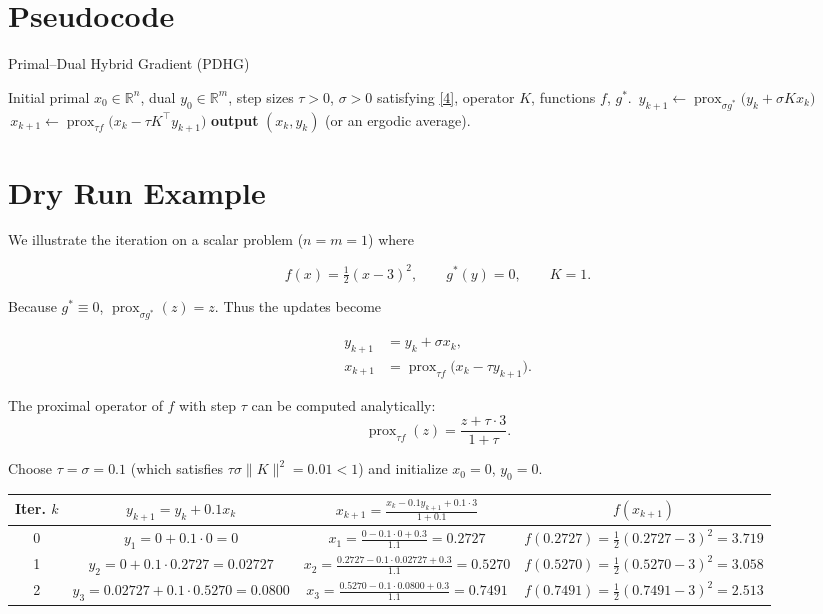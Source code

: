 \documentclass{article}
\newcommand{\prox}{\operatorname{prox}}
\begin{document}
\section*{Pseudocode}
\begin{algorithm}[H]
\caption{Primal–Dual Hybrid Gradient (PDHG)}\label{alg:pdhg}
\begin{algorithmic}[1]
\Require Initial primal $x_{0}\in\mathbb{R}^{n}$, dual $y_{0}\in\mathbb{R}^{m}$,
step sizes $\tau>0$, $\sigma>0$ satisfying \eqref{4},
operator $K$, functions $f$, $g^{*}$.
    \State $\,y_{k+1}\gets \prox_{\sigma g^{*}}\!\bigl(y_{k}+\sigma Kx_{k}\bigr)$ 
    \State $\,x_{k+1}\gets \prox_{\tau f}\!\bigl(x_{k}-\tau K^{\top}y_{k+1}\bigr)$ 
\EndFor
\State \textbf{output} $(x_{k},y_{k})$ (or an ergodic average).
\end{algorithmic}
\end{algorithm}

\section*{Dry Run Example}
We illustrate the iteration on a scalar problem ($n=m=1$) where  

\[
f(x)=\tfrac12 (x-3)^{2},\qquad g^{*}(y)=0,\qquad K=1.
\]

Because $g^{*}\equiv0$, $\prox_{\sigma g^{*}}(z)=z$.  
Thus the updates become  

\[
\begin{aligned}
y_{k+1}&=y_{k}+\sigma x_{k},\\
x_{k+1}&=\prox_{\tau f}\!\bigl(x_{k}-\tau y_{k+1}\bigr).
\end{aligned}
\]

The proximal operator of $f$ with step $\tau$ can be computed analytically:
\[
\prox_{\tau f}(z)=\frac{z+\tau\cdot 3}{1+\tau}.
\tag{5}
\]

Choose $\tau=\sigma=0.1$ (which satisfies $\tau\sigma\|K\|^{2}=0.01<1$) and initialize $x_{0}=0$, $y_{0}=0$.

\begin{center}
\begin{tabular}{c|c|c|c}
\textbf{Iter.} $k$ & $y_{k+1}=y_{k}+0.1x_{k}$ & $x_{k+1}= \displaystyle\frac{x_{k}-0.1y_{k+1}+0.1\cdot3}{1+0.1}$ & $f(x_{k+1})$\\ \hline
0 & $y_{1}=0+0.1\cdot0=0$ &
$x_{1}= \frac{0-0.1\cdot0+0.3}{1.1}=0.2727$ &
$f(0.2727)=\tfrac12(0.2727-3)^{2}=3.719$\\[2mm]
1 & $y_{2}=0+0.1\cdot0.2727=0.02727$ &
$x_{2}= \frac{0.2727-0.1\cdot0.02727+0.3}{1.1}=0.5270$ &
$f(0.5270)=\tfrac12(0.5270-3)^{2}=3.058$\\[2mm]
2 & $y_{3}=0.02727+0.1\cdot0.5270=0.0800$ &
$x_{3}= \frac{0.5270-0.1\cdot0.0800+0.3}{1.1}=0.7491$ &
$f(0.7491)=\tfrac12(0.7491-3)^{2}=2.513$
\end{tabular}
\end{center}
\end{document}
